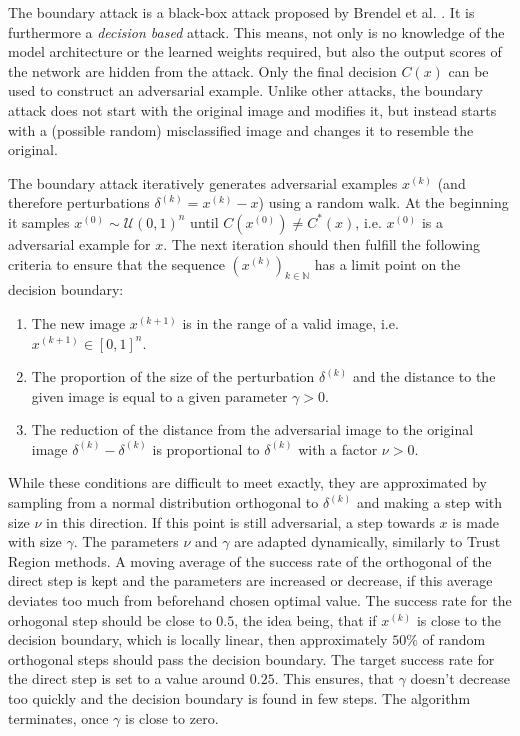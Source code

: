 The boundary attack is a black-box attack proposed by Brendel et al. \cite{boundary}. It is furthermore a \emph{decision based} attack. This means, not only is no knowledge of the model architecture or the learned weights required, but also the output scores of the network are hidden from the attack. Only the final decision $C(x)$ can be used to construct an adversarial example.
Unlike other attacks, the boundary attack does not start with the original image and modifies it, but instead starts with a (possible random) misclassified image and changes it to resemble the original.

The boundary attack iteratively generates adversarial examples $x^{(k)}$ (and therefore perturbations $\delta^{(k)} = x^{(k)} - x$) using a random walk. At the beginning it samples $x^{(0)} \sim \mathcal{U}(0,1)^n$ until $C(x^{(0)}) \neq C^*(x)$, i.e. $x^{(0)}$ is a adversarial example for $x$.
The next iteration should then fulfill the following criteria to ensure that the sequence $(x^{(k)})_{k \in \mathbb{N}}$ has a limit point on the decision boundary:

\begin{enumerate}
	\item The new image $x^{(k+1)}$ is in the range of a valid image,
	i.e. $x^{(k+1)}\in [0,1]^n$.
	\item The proportion of the size of the perturbation $\delta^{(k)}$
	and the distance to the given image is equal to a given parameter
	$\gamma > 0$.
	\item The reduction of the distance from the adversarial image to the
	original image $\delta^{(k)} - \delta^{(k)}$ is proportional to
	$\delta^{(k)}$ with a factor $\nu>0$.
\end{enumerate}

While these conditions are difficult to meet exactly, they are approximated by sampling from a normal distribution orthogonal to $\delta^{(k)}$ and making a step with size $\nu$ in this direction. If this point is still adversarial, a step towards $x$ is made with size $\gamma$. The parameters $\nu$ and $\gamma$ are adapted dynamically, similarly to Trust Region methods.
A moving average of the success rate of the orthogonal of the direct step is kept and the parameters are increased or decrease, if this average deviates too much from beforehand chosen optimal value.
The success rate for the orhogonal step should be close to $0.5$, the idea being, that if $x^{(k)}$ is close to the decision boundary, which is locally linear, then approximately $50\%$ of random orthogonal steps should pass the decision boundary.
The target success rate for the direct step is set to a value around $0.25$. This ensures, that $\gamma$ doesn't decrease too quickly and the decision boundary is found in few steps.
The algorithm terminates, once $\gamma$ is close to zero.

